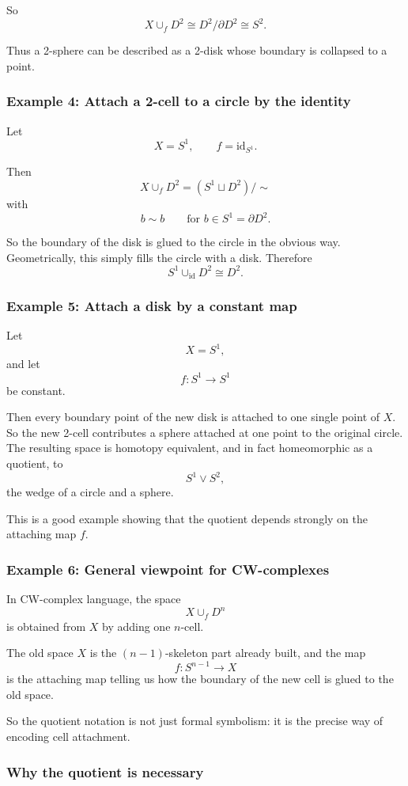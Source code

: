 \documentclass[12pt,a4paper]{article}
\theoremstyle{notespace}
\begin{document}
So
\[
X\cup_f D^2 \cong D^2/\partial D^2 \cong S^2.
\]

Thus a 2-sphere can be described as a 2-disk whose boundary is collapsed to a point.

\subsubsection{Example 4: Attach a 2-cell to a circle by the identity}

Let
\[
X=S^1,
\qquad
f=\mathrm{id}_{S^1}.
\]

Then
\[
X\cup_f D^2=(S^1\sqcup D^2)/\sim
\]
with
\[
b\sim b
\qquad
\text{for } b\in S^1=\partial D^2.
\]

So the boundary of the disk is glued to the circle in the obvious way. Geometrically, this simply fills the circle with a disk. Therefore
\[
S^1\cup_{\mathrm{id}} D^2 \cong D^2.
\]

\subsubsection{Example 5: Attach a disk by a constant map}

Let
\[
X=S^1,
\]
and let
\[
f:S^1\to S^1
\]
be constant.

Then every boundary point of the new disk is attached to one single point of \(X\). So the new 2-cell contributes a sphere attached at one point to the original circle. The resulting space is homotopy equivalent, and in fact homeomorphic as a quotient, to
\[
S^1\vee S^2,
\]
the wedge of a circle and a sphere.

This is a good example showing that the quotient depends strongly on the attaching map \(f\).

\subsubsection{Example 6: General viewpoint for CW-complexes}

In CW-complex language, the space
\[
X\cup_f D^n
\]
is obtained from \(X\) by adding one \(n\)-cell.

The old space \(X\) is the \((n-1)\)-skeleton part already built, and the map
\[
f:S^{n-1}\to X
\]
is the attaching map telling us how the boundary of the new cell is glued to the old space.

So the quotient notation is not just formal symbolism: it is the precise way of encoding cell attachment.

\subsubsection{Why the quotient is necessary}
\end{document}

